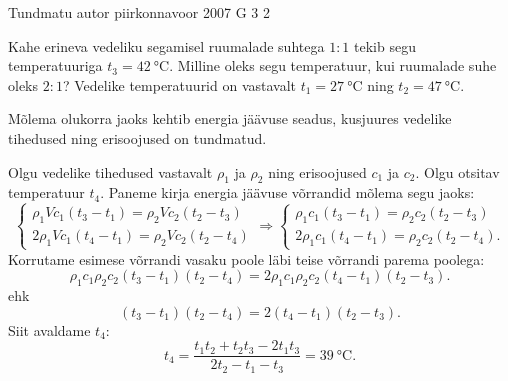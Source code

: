 {Tundmatu autor} %
{piirkonnavoor} %
{2007} %
{G 3} %
{2} %
{
\ifStatement
Kahe erineva vedeliku segamisel ruumalade suhtega $1 : 1$ tekib segu temperatuuriga $t_3 = \SI{42}{\celsius}$. Milline oleks segu temperatuur, kui ruumalade suhe oleks $2 : 1$? Vedelike temperatuurid on vastavalt $t_1 = \SI{27}{\celsius}$ ning $t_2 = \SI{47}{\celsius}$.
\fi


\ifHint
Mõlema olukorra jaoks kehtib energia jäävuse seadus, kusjuures vedelike tihedused ning erisoojused on tundmatud.
\fi


\ifSolution
Olgu vedelike tihedused vastavalt $\rho_1$ ja $\rho_2$ ning erisoojused $c_1$ ja $c_2$. Olgu otsitav temperatuur $t_4$. Paneme kirja energia jäävuse võrrandid mõlema segu jaoks:
\[
\left\{\begin{array}{l}
	{\rho_{1} V c_{1}\left(t_{3}-t_{1}\right)=\rho_{2} V c_{2}\left(t_{2}-t_{3}\right)} \\ {2 \rho_{1} V c_{1}\left(t_{4}-t_{1}\right)=\rho_{2} V c_{2}\left(t_{2}-t_{4}\right)}\end{array} \Rightarrow\left\{\begin{array}{l}{\rho_{1} c_{1}\left(t_{3}-t_{1}\right)=\rho_{2} c_{2}\left(t_{2}-t_{3}\right)} \\ {2 \rho_{1} c_{1}\left(t_{4}-t_{1}\right)=\rho_{2} c_{2}\left(t_{2}-t_{4}\right).}
\end{array}\right.\right.
\]
Korrutame esimese võrrandi vasaku poole läbi teise võrrandi parema poolega:
\[
\rho_{1} c_{1} \rho_{2} c_{2}\left(t_{3}-t_{1}\right)\left(t_{2}-t_{4}\right) =2 \rho_{1} c_{1} \rho_{2} c_{2}\left(t_{4}-t_{1}\right)\left(t_{2}-t_{3}\right).
\]
ehk
\[
\left(t_{3}-t_{1}\right)\left(t_{2}-t_{4}\right) =2\left(t_{4}-t_{1}\right)\left(t_{2}-t_{3}\right).
\]
Siit avaldame $t_4$:
\[
t_{4}=\frac{t_{1} t_{2}+t_{2} t_{3}-2 t_{1} t_{3}}{2 t_{2}-t_{1}-t_{3}}=\SI{39}{\celsius}.
\]
\fi
}
